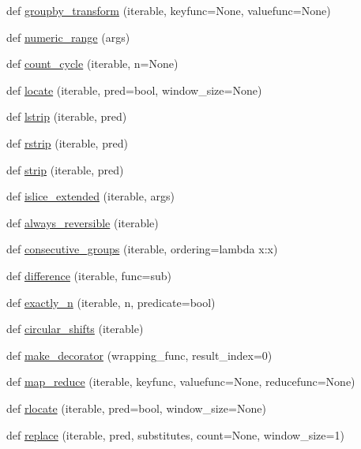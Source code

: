 \begin{DoxyCompactItemize}
\item 
def \hyperlink{namespacemore__itertools_1_1more_a78d2df36687e0e1116b8cdac592be650}{groupby\+\_\+transform} (iterable, keyfunc=None, valuefunc=None)
\item 
def \hyperlink{namespacemore__itertools_1_1more_ae5b29c07e9e55ae5f3a86296e60c4abe}{numeric\+\_\+range} (args)
\item 
def \hyperlink{namespacemore__itertools_1_1more_a5eb1ee45109d68efd9ac8101205751bb}{count\+\_\+cycle} (iterable, n=None)
\item 
def \hyperlink{namespacemore__itertools_1_1more_a6205759d80f372f3fb3b9563755176f1}{locate} (iterable, pred=bool, window\+\_\+size=None)
\item 
def \hyperlink{namespacemore__itertools_1_1more_a1c0c8a99ae094fa00eea3f0e9726d4f7}{lstrip} (iterable, pred)
\item 
def \hyperlink{namespacemore__itertools_1_1more_a47860d5a7bb908215bea62c2180c5655}{rstrip} (iterable, pred)
\item 
def \hyperlink{namespacemore__itertools_1_1more_a694868b8622b0a3e098836d687eb091b}{strip} (iterable, pred)
\item 
def \hyperlink{namespacemore__itertools_1_1more_ab68caf22251b072e1ddd4db4b183d340}{islice\+\_\+extended} (iterable, args)
\item 
def \hyperlink{namespacemore__itertools_1_1more_a21d1b430f90e2813049a38e20276a92b}{always\+\_\+reversible} (iterable)
\item 
def \hyperlink{namespacemore__itertools_1_1more_ab8a744987f80e38d4224517f0a5e97f0}{consecutive\+\_\+groups} (iterable, ordering=lambda x\+:x)
\item 
def \hyperlink{namespacemore__itertools_1_1more_add926afc702bf1ee38e17059cf4d4e5b}{difference} (iterable, func=sub)
\item 
def \hyperlink{namespacemore__itertools_1_1more_a2965e4ada7a3250d4580918778305a40}{exactly\+\_\+n} (iterable, n, predicate=bool)
\item 
def \hyperlink{namespacemore__itertools_1_1more_a7e66a1597fd81e83fbf34c5c1ef06958}{circular\+\_\+shifts} (iterable)
\item 
def \hyperlink{namespacemore__itertools_1_1more_aba5c7930c140e775f168fa969ca26a40}{make\+\_\+decorator} (wrapping\+\_\+func, result\+\_\+index=0)
\item 
def \hyperlink{namespacemore__itertools_1_1more_a67141a9a2ee17eae291e30e659365869}{map\+\_\+reduce} (iterable, keyfunc, valuefunc=None, reducefunc=None)
\item 
def \hyperlink{namespacemore__itertools_1_1more_abd74b75c503cc19f15331d76960da312}{rlocate} (iterable, pred=bool, window\+\_\+size=None)
\item 
def \hyperlink{namespacemore__itertools_1_1more_a808464682049f7e501e04723780b1208}{replace} (iterable, pred, substitutes, count=None, window\+\_\+size=1)
\end{DoxyCompactItemize}
